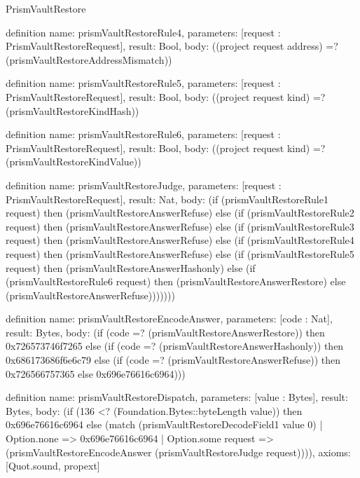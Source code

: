 \begin{lexlean}{PrismVaultRestore}
\begin{semanticmodule}
definition{
  name: prismVaultRestoreRule4,
  parameters: [request : PrismVaultRestoreRequest],
  result: Bool,
  body: ((project request address) =? (prismVaultRestoreAddressMismatch))
}

definition{
  name: prismVaultRestoreRule5,
  parameters: [request : PrismVaultRestoreRequest],
  result: Bool,
  body: ((project request kind) =? (prismVaultRestoreKindHash))
}

definition{
  name: prismVaultRestoreRule6,
  parameters: [request : PrismVaultRestoreRequest],
  result: Bool,
  body: ((project request kind) =? (prismVaultRestoreKindValue))
}

definition{
  name: prismVaultRestoreJudge,
  parameters: [request : PrismVaultRestoreRequest],
  result: Nat,
  body: (if (prismVaultRestoreRule1 request) then (prismVaultRestoreAnswerRefuse) else (if (prismVaultRestoreRule2 request) then (prismVaultRestoreAnswerRefuse) else (if (prismVaultRestoreRule3 request) then (prismVaultRestoreAnswerRefuse) else (if (prismVaultRestoreRule4 request) then (prismVaultRestoreAnswerRefuse) else (if (prismVaultRestoreRule5 request) then (prismVaultRestoreAnswerHashonly) else (if (prismVaultRestoreRule6 request) then (prismVaultRestoreAnswerRestore) else (prismVaultRestoreAnswerRefuse)))))))
}

definition{
  name: prismVaultRestoreEncodeAnswer,
  parameters: [code : Nat],
  result: Bytes,
  body: (if (code =? (prismVaultRestoreAnswerRestore)) then 0x726573746f7265 else (if (code =? (prismVaultRestoreAnswerHashonly)) then 0x686173686f6e6c79 else (if (code =? (prismVaultRestoreAnswerRefuse)) then 0x726566757365 else 0x696e76616c6964)))
}

definition{
  name: prismVaultRestoreDispatch,
  parameters: [value : Bytes],
  result: Bytes,
  body: (if (136 <? (Foundation.Bytes::byteLength value)) then 0x696e76616c6964 else (match (prismVaultRestoreDecodeField1 value 0)
    | Option.none => 0x696e76616c6964
    | Option.some request => (prismVaultRestoreEncodeAnswer (prismVaultRestoreJudge request)))),
  axioms: [Quot.sound, propext]
}
\end{semanticmodule}
\end{lexlean}

